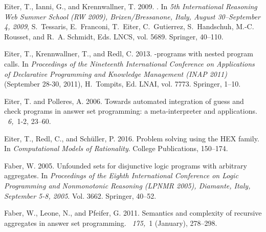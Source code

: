 \begin{thebibliography}{}
{\sc Eiter, T.}, {\sc Ianni, G.}, {\sc and} {\sc Krennwallner, T.} 2009.
.
\newblock In {\em 5th International Reasoning Web Summer School (RW 2009),
  Brixen/Bressanone, Italy, August 30--September 4, 2009}, {S.~Tessaris},
  {E.~Franconi}, {T.~Eiter}, {C.~Gutierrez}, {S.~Handschuh}, {M.-C. Rousset},
  {and} {R.~A. Schmidt}, Eds. LNCS, vol. 5689. Springer, 40--110.

{\sc Eiter, T.}, {\sc Krennwallner, T.}, {\sc and} {\sc Redl, C.} 2013.
-programs with nested program calls.
\newblock In {\em Proceedings of the Nineteenth International Conference on
  Applications of Declarative Programming and Knowledge Management (INAP 2011)}
  (September 28-30, 2011), {H.~Tompits}, Ed. LNAI, vol. 7773. Springer, 1--10.

{\sc Eiter, T.} {\sc and} {\sc Polleres, A.} 2006.
\newblock Towards automated integration of guess and check programs in answer
  set programming: a meta-interpreter and applications.
~{\em 6,\/}~1-2, 23--60.

{\sc Eiter, T.}, {\sc Redl, C.}, {\sc and} {\sc Sch{\"{u}}ller, P.} 2016.
\newblock Problem solving using the {HEX} family.
\newblock In {\em Computational Models of Rationality}. College Publications,
  150--174.

{\sc Faber, W.} 2005.
\newblock Unfounded sets for disjunctive logic programs with arbitrary
  aggregates.
\newblock In {\em Proceedings of the Eighth International Conference on Logic
  Programming and Nonmonotonic Reasoning (LPNMR 2005), Diamante, Italy,
  September 5-8, 2005}. Vol. 3662. Springer, 40--52.

{\sc Faber, W.}, {\sc Leone, N.}, {\sc and} {\sc Pfeifer, G.} 2011.
\newblock Semantics and complexity of recursive aggregates in answer set
  programming.
~{\em 175,\/}~1 (January), 278--298.


\end{thebibliography}
